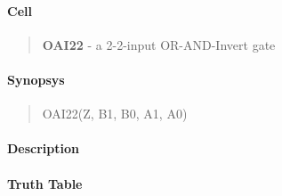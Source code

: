 \label{OAI22}
\paragraph{Cell}
\begin{quote}
    \textbf{OAI22} - a 2-2-input OR-AND-Invert gate
\end{quote}

\paragraph{Synopsys}
\begin{quote}
    OAI22(Z, B1, B0, A1, A0)
\end{quote}

\paragraph{Description}



\paragraph{Truth Table}


